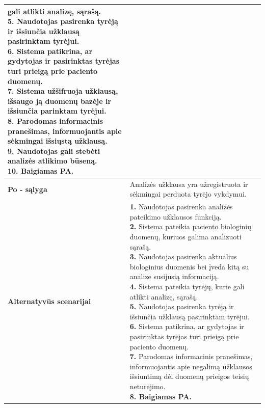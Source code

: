 \documentclass[12pt]{article}
\begin{document}
\begin{table}[htb!]
\begin{tabular}{|m{3cm}|m{13.7cm}|}
{{{            gali atlikti analizę, sąrašą.} \\
            \textbf{5.} \textcolor{dartmouthgreen}{Naudotojas pasirenka tyrėją ir
            išsiunčia užklausą pasirinktam tyrėjui.} \\
            \textbf{6.} {Sistema patikrina, ar gydytojas
            ir pasirinktas tyrėjas turi prieigą prie paciento duomenų.} \\
            \textbf{7.} {Sistema užšifruoja užklausą,
            išsaugo ją duomenų bazėje ir išsiunčia parinktam tyrėjui.} \\
            \textbf{8.} {Parodomas informacinis
            pranešimas, informuojantis apie sėkmingai išsiųstą užklausą.} \\
            \textbf{9.} \textcolor{dartmouthgreen}{Naudotojas gali stebėti
            analizės atlikimo būseną.} \\
            \textbf{10. Baigiamas PA.}
        }}
        \\
        \hline
        \raggedleft \textbf{\cellcolor{deepchampagne}Po - sąlyga} &
        Analizės užklausa yra užregistruota ir sėkmingai perduota tyrėjo
        vykdymui. \\
        \hline
        \raggedleft \textbf{\cellcolor{deepchampagne}Alternatyvūs scenarijai} &
        \vskip 5pt
        \makecell[l]{\parbox[t]{13.7cm}{
            \textbf{1.} \textcolor{dartmouthgreen}{Naudotojas pasirenka analizės
            pateikimo užklausos funkciją.} \\
            \textbf{2.} {Sistema pateikia paciento
            biologinių duomenų, kuriuos galima analizuoti sąrašą.} \\
            \textbf{3.} \textcolor{dartmouthgreen}{Naudotojas pasirenka
            aktualius biologinius duomenis bei įveda kitą su analize susijusią
            informaciją.} \\
            \textbf{4.} {Sistema pateikia tyrėjų, kurie
            gali atlikti analizę, sąrašą.} \\
            \textbf{5.} \textcolor{dartmouthgreen}{Naudotojas pasirenka tyrėją
            ir išsiunčia užklausą pasirinktam tyrėjui.} \\
            \textbf{6.} {Sistema patikrina, ar gydytojas
            ir pasirinktas tyrėjas turi prieigą prie paciento duomenų.} \\
            \textbf{7.} {Parodomas informacinis
            pranešimas, informuojantis apie negalimą užklausos išsiuntimą dėl
            duomenų prieigos teisių neturėjimo.} \\
            \textbf{8. Baigiamas PA.}
        }}
        \\
        \hline
    \end{tabular}
\end{table}
\end{document}
